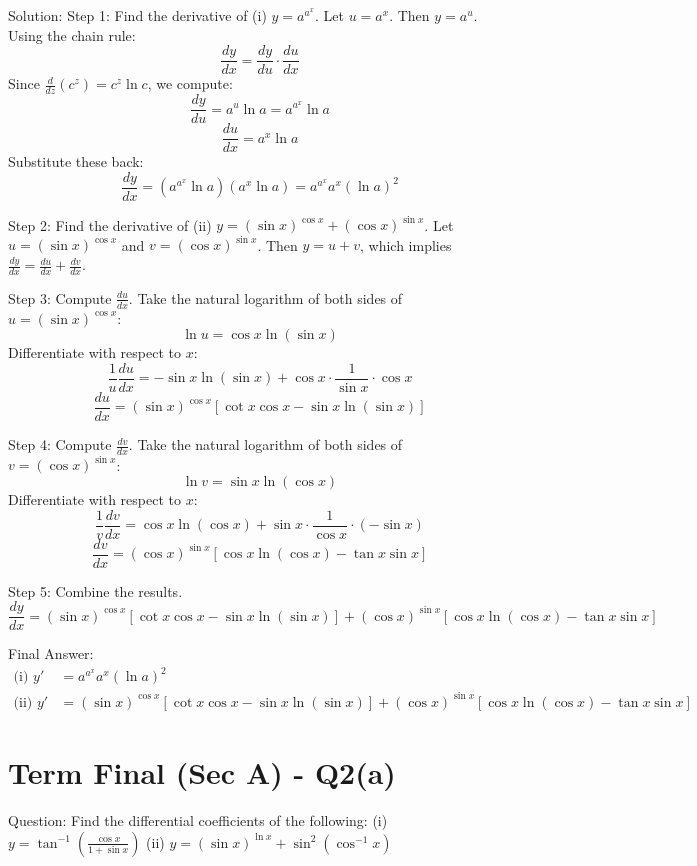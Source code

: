 \documentclass[11pt, a4paper]{article}
\begin{document}
Solution:
Step 1: Find the derivative of (i) $y = a^{a^x}$.
Let $u = a^x$. Then $y = a^u$. Using the chain rule:
$$\frac{dy}{dx} = \frac{dy}{du} \cdot \frac{du}{dx}$$
Since $\frac{d}{dz}(c^z) = c^z \ln c$, we compute:
$$\frac{dy}{du} = a^u \ln a = a^{a^x} \ln a$$
$$\frac{du}{dx} = a^x \ln a$$
Substitute these back:
$$\frac{dy}{dx} = \left(a^{a^x} \ln a\right) \left(a^x \ln a\right) = a^{a^x} a^x (\ln a)^2$$

Step 2: Find the derivative of (ii) $y = (\sin x)^{\cos x} + (\cos x)^{\sin x}$.
Let $u = (\sin x)^{\cos x}$ and $v = (\cos x)^{\sin x}$. Then $y = u + v$, which implies $\frac{dy}{dx} = \frac{du}{dx} + \frac{dv}{dx}$.

Step 3: Compute $\frac{du}{dx}$.
Take the natural logarithm of both sides of $u = (\sin x)^{\cos x}$:
$$\ln u = \cos x \ln(\sin x)$$
Differentiate with respect to $x$:
$$\frac{1}{u} \frac{du}{dx} = -\sin x \ln(\sin x) + \cos x \cdot \frac{1}{\sin x} \cdot \cos x$$
$$\frac{du}{dx} = (\sin x)^{\cos x} \left[ \cot x \cos x - \sin x \ln(\sin x) \right]$$

Step 4: Compute $\frac{dv}{dx}$.
Take the natural logarithm of both sides of $v = (\cos x)^{\sin x}$:
$$\ln v = \sin x \ln(\cos x)$$
Differentiate with respect to $x$:
$$\frac{1}{v} \frac{dv}{dx} = \cos x \ln(\cos x) + \sin x \cdot \frac{1}{\cos x} \cdot (-\sin x)$$
$$\frac{dv}{dx} = (\cos x)^{\sin x} \left[ \cos x \ln(\cos x) - \tan x \sin x \right]$$

Step 5: Combine the results.
$$\frac{dy}{dx} = (\sin x)^{\cos x} \left[ \cot x \cos x - \sin x \ln(\sin x) \right] + (\cos x)^{\sin x} \left[ \cos x \ln(\cos x) - \tan x \sin x \right]$$

Final Answer:
$$
\boxed{\begin{aligned}
\text{(i) } y' &= a^{a^x} a^x (\ln a)^2 \\
\text{(ii) } y' &= (\sin x)^{\cos x} [ \cot x \cos x - \sin x \ln(\sin x) ] + (\cos x)^{\sin x} [ \cos x \ln(\cos x) - \tan x \sin x ]
\end{aligned}}
$$


\section*{Term Final (Sec A) - Q2(a)}
Question:
Find the differential coefficients of the following:
(i) $y = \tan^{-1}\left(\frac{\cos x}{1+\sin x}\right)$
(ii) $y = (\sin x)^{\ln x} + \sin^2(\cos^{-1} x)$
\end{document}
